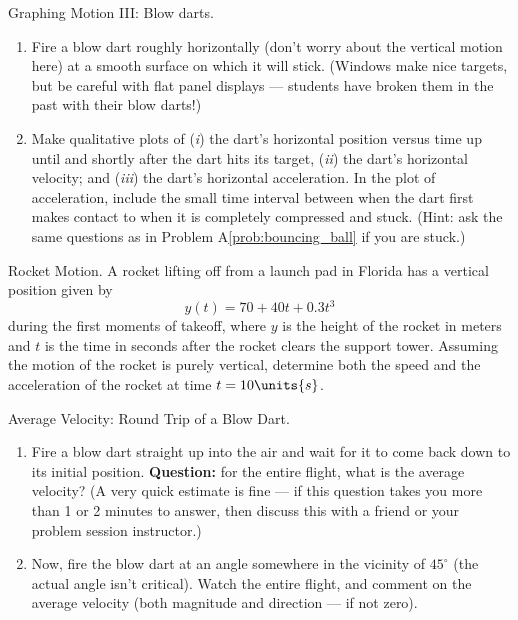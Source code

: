 \begin{aproblem}{Graphing Motion III: Blow darts.}
  \begin{enumerate}
  \item Fire a blow dart roughly horizontally (don't worry about the
    vertical motion here) at a smooth surface on which it will
    stick. (Windows make nice targets, but be careful with flat panel
    displays --- students have broken them in the past with their blow
    darts!)

  \item Make qualitative plots of ({\it i}) the dart's horizontal position
    versus time up until and shortly after the dart hits its target,
    ({\it ii}) the dart's horizontal velocity; and ({\it iii}) the dart's
    horizontal acceleration.  In the plot of acceleration, include the
    small time interval between when the dart first makes contact to
    when it is completely compressed and stuck.  (Hint: ask the same
    questions as in Problem A\ref{prob:bouncing_ball} if you are
    stuck.)
  \end{enumerate}
\end{aproblem}

\begin{aproblem}{Rocket Motion.}
  A rocket lifting off from a launch pad in Florida has a vertical
  position given by
  \[ y(t) = 70 + 40t + 0.3t^3 \] during the first moments of takeoff,
  where $y$ is the height of the rocket in meters and $t$ is the time
  in seconds after the rocket clears the support tower.  Assuming the
  motion of the rocket is purely vertical, determine both the speed
  and the acceleration of the rocket at time $t = 10\units{s}$.
  \label{prob:rocket_motion}
\end{aproblem}



\begin{aproblem}{Average Velocity: Round Trip of a Blow Dart.}
  \begin{enumerate}
  \item Fire a blow dart straight up into the air and wait for it to
    come back down to its initial position.  {\bf Question:} for the
    entire flight, what is the average velocity?  (A very quick
    estimate is fine --- if this question takes you more than 1 or 2
    minutes to answer, then discuss this with a friend or your problem
    session instructor.)

  \item Now, fire the blow dart at an angle somewhere in the vicinity
    of $45^\circ$ (the actual angle isn't critical).  Watch the entire
    flight, and comment on the average velocity (both magnitude and
    direction --- if not zero).
  \end{enumerate}
  \label{prob:blow_dart}
\end{aproblem}



